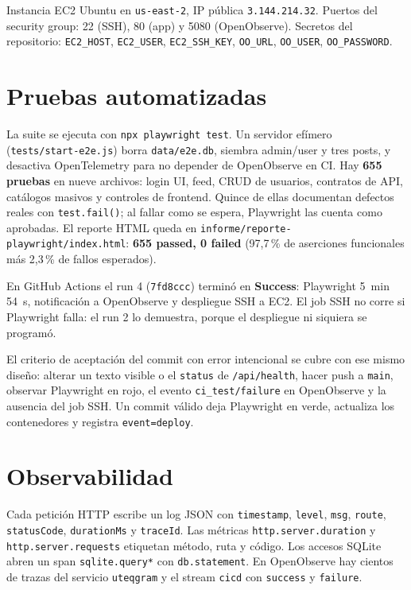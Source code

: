 \documentclass[12pt,letterpaper]{article}
\begin{document}
Instancia EC2 Ubuntu en \texttt{us-east-2}, IP p\'ublica \texttt{3.144.214.32}. Puertos del security group: 22 (SSH), 80 (app) y 5080 (OpenObserve). Secretos del repositorio: \texttt{EC2\_HOST}, \texttt{EC2\_USER}, \texttt{EC2\_SSH\_KEY}, \texttt{OO\_URL}, \texttt{OO\_USER}, \texttt{OO\_PASSWORD}.

\section{Pruebas automatizadas}

La suite se ejecuta con \texttt{npx playwright test}. Un servidor ef\'imero (\texttt{tests/start-e2e.js}) borra \texttt{data/e2e.db}, siembra admin/user y tres posts, y desactiva OpenTelemetry para no depender de OpenObserve en CI. Hay \textbf{655 pruebas} en nueve archivos: login UI, feed, CRUD de usuarios, contratos de API, cat\'alogos masivos y controles de frontend. Quince de ellas documentan defectos reales con \texttt{test.fail()}; al fallar como se espera, Playwright las cuenta como aprobadas. El reporte HTML queda en \texttt{informe/reporte-playwright/index.html}: \textbf{655 passed, 0 failed} (97{,}7\,\% de aserciones funcionales m\'as 2{,}3\,\% de fallos esperados).

En GitHub Actions el run 4 (\texttt{7fd8ccc}) termin\'o en \textbf{Success}: Playwright 5~min 54~s, notificaci\'on a OpenObserve y despliegue SSH a EC2. El job SSH no corre si Playwright falla: el run 2 lo demuestra, porque el despliegue ni siquiera se program\'o.

El criterio de aceptaci\'on del commit con error intencional se cubre con ese mismo dise\~no: alterar un texto visible o el \texttt{status} de \texttt{/api/health}, hacer push a \texttt{main}, observar Playwright en rojo, el evento \texttt{ci\_test/failure} en OpenObserve y la ausencia del job SSH. Un commit v\'alido deja Playwright en verde, actualiza los contenedores y registra \texttt{event=deploy}.

\section{Observabilidad}

Cada petici\'on HTTP escribe un log JSON con \texttt{timestamp}, \texttt{level}, \texttt{msg}, \texttt{route}, \texttt{statusCode}, \texttt{durationMs} y \texttt{traceId}. Las m\'etricas \texttt{http.server.duration} y \texttt{http.server.requests} etiquetan m\'etodo, ruta y c\'odigo. Los accesos SQLite abren un span \texttt{sqlite.query*} con \texttt{db.statement}. En OpenObserve hay cientos de trazas del servicio \texttt{uteqgram} y el stream \texttt{cicd} con \texttt{success} y \texttt{failure}.
\end{document}
